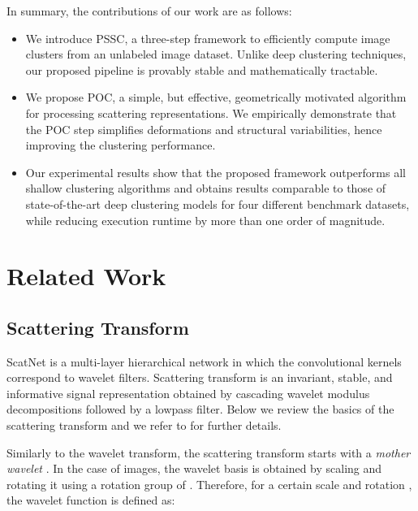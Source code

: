 \documentclass[11pt]{article}
\theoremstyle{definition}
\begin{document}
In summary, the contributions of our work are as follows:

\begin{itemize}
	\item We introduce PSSC, a three-step framework to efficiently compute image clusters from an unlabeled image dataset. Unlike deep clustering techniques, our proposed pipeline is provably stable and mathematically tractable.
	
	\item We propose POC, a simple, but effective, geometrically motivated algorithm for processing scattering representations. We empirically demonstrate that the POC step simplifies deformations and structural variabilities, hence improving the clustering performance.
	
	\item Our experimental results show that the proposed framework outperforms all shallow clustering algorithms and obtains results comparable to those of state-of-the-art deep clustering models for four different benchmark datasets, while reducing execution runtime by more than one order of magnitude.
	
	
\end{itemize}




\section{Related Work}\label{sec:related}


\subsection{Scattering Transform}\label{sec:scattering}

ScatNet \cite{Mallat_GroupInvariantScattering_2012, Bruna_InvariantScattering_2012} is a multi-layer hierarchical network in which the convolutional kernels correspond to wavelet filters. Scattering transform is an invariant, stable, and informative signal representation obtained by cascading wavelet modulus decompositions followed by a lowpass filter. Below we review the basics of the scattering transform and we refer to \cite{Bruna_InvariantScattering_2012} for further details.

Similarly to the wavelet transform, the scattering transform starts with a \textit{mother wavelet} . In the case of images, the wavelet basis is obtained by scaling  and rotating it using a rotation group  of . Therefore, for a certain scale  and rotation , the wavelet function is defined as:
\end{document}
